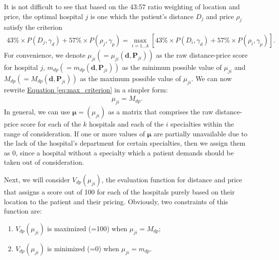 \documentclass{article}
\begin{document}
It is not difficult to see that based on the 43:57 ratio weighting of location and price, the optimal hospital $j$ is one which the patient's distance $D_j$ and price $\rho_j$ satisfy the criterion
\begin{gather}\label{eq:max_criterion}
    43\% \times P\left(D_j, \gamma_d\right) + 57\% \times P\left(\rho_j, \gamma_p\right) = \max_{i = 1\dots k} \left[43\% \times P\left(D_i, \gamma_d\right) + 57\% \times P\left(\rho_i, \gamma_p\right)\right].
\end{gather}
For convenience, we denote $\mu_{ji} (=\!\mu_{ji}\left(\mathbf{d}, \mathbf{P}_{ji}\right))$ as the raw distance-price score for hospital $j$, $m_{dp} (=\!m_{dp}\left(\mathbf{d}, \mathbf{P}_{ji}\right))$ as the minimum possible value of $\mu_{ji}$ and $M_{dp} (=\!M_{dp}\left(\mathbf{d}, \mathbf{P}_{ji}\right))$ as the maximum possible value of $\mu_{ji}$. We can now rewrite \hyperref[eq:max_criterion]{Equation \ref*{eq:max_criterion}} in a simpler form:
\begin{gather}
    \mu_{ji} = M_{dp}.
\end{gather}
In general, we can use $\boldsymbol{\mu} = (\mu_{ji})$ as a matrix that comprises the raw distance-price score for each of the $k$ hospitals and each of the $i$ specialties within the range of consideration. If one or more values of $\boldsymbol{\mu}$ are partially unavailable due to the lack of the hospital's department for certain specialties, then we assign them as 0, since a hospital without a specialty which a patient demands should be taken out of consideration.

Next, we will consider $V_{dp}\left(\mu_{ji}\right)$, the evaluation function for distance and price that assigns a score out of 100 for each of the hospitals purely based on their location to the patient and their pricing. Obviously, two constraints of this function are:
\begin{enumerate}
    \item $V_{dp}\left(\mu_{ji}\right)$ is maximized (=100) when $\mu_{ji} = M_{dp}$;
    \item $V_{dp}\left(\mu_{ji}\right)$ is minimized (=0) when $\mu_{ji} = m_{dp}$.
\end{enumerate}
\end{document}
